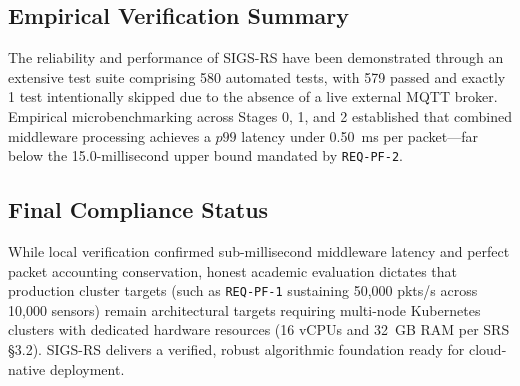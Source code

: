 \subsection{Empirical Verification Summary}
The reliability and performance of SIGS-RS have been demonstrated through an extensive test suite comprising 580 automated tests, with 579 passed and exactly 1 test intentionally skipped due to the absence of a live external MQTT broker. Empirical microbenchmarking across Stages 0, 1, and 2 established that combined middleware processing achieves a $p99$ latency under 0.50~ms per packet---far below the 15.0-millisecond upper bound mandated by \texttt{REQ-PF-2}.

\subsection{Final Compliance Status}
While local verification confirmed sub-millisecond middleware latency and perfect packet accounting conservation, honest academic evaluation dictates that production cluster targets (such as \texttt{REQ-PF-1} sustaining 50,000 pkts/s across 10,000 sensors) remain architectural targets requiring multi-node Kubernetes clusters with dedicated hardware resources (16 vCPUs and 32~GB RAM per SRS §3.2). SIGS-RS delivers a verified, robust algorithmic foundation ready for cloud-native deployment.
